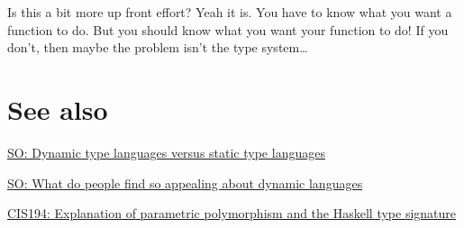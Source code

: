 \documentclass[12pt]{article}
\begin{document}
Is this a bit more up front effort? Yeah it is. You have to know what
you want a function to do. But you should know what you want your
function to do! If you don't, then maybe the problem isn't the type
system\ldots{}

\section{See also}\label{see-also}\indent

\href{http://stackoverflow.com/questions/125367/dynamic-type-languages-versus-static-type-languages}{SO:
Dynamic type languages versus static type languages}

\href{http://stackoverflow.com/questions/42934/what-do-people-find-so-appealing-about-dynamic-languages}{SO:
What do people find so appealing about dynamic languages}

\href{http://www.seas.upenn.edu/~cis194/spring13/lectures/05-type-classes.html}{CIS194:
Explanation of parametric polymorphism and the Haskell type signature}
\end{document}
